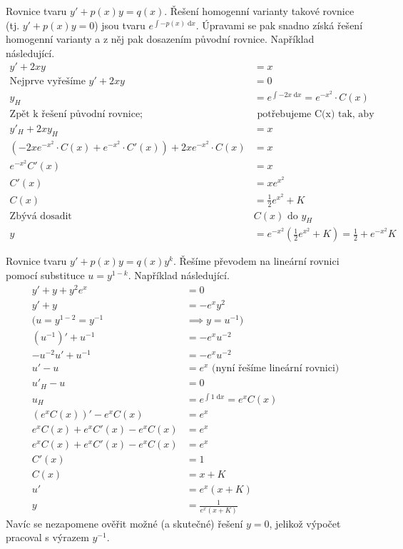 \begin{example}[Lineární rovnice]
    Rovnice tvaru $y' + p(x)y = q(x)$.
    Řešení homogenní varianty takové rovnice (tj. $y' + p(x)y = 0$)
    jsou tvaru $e^{\int -p(x) \; \text{d}x}$.
    Úpravami se pak snadno získá řešení homogenní varianty a z něj pak
    dosazením původní rovnice.
    Například následující.
\begin{align*}
    y' + 2xy        &= x \\
    \text{Nejprve vyřešíme } y' + 2xy &= 0 &\\
    y_H &= e^{\int -2x \; \text{d}x} = e^{-x^2} \cdot C(x) \\
    \text{Zpět k řešení původní rovnice;}&\text{ potřebujeme C(x) tak, aby} \\
    y'_H + 2xy_H   &= x \\
    (-2x e^{-x^2} \cdot C(x) + e^{-x^2} \cdot C'(x)) + 2x e^{-x^2}\cdot C(x) &= x \\
    e^{-x^2} C'(x) &= x \\
    C'(x) &= x e^{x^2} \\
    C(x)  &= \frac{1}{2} e^{x^2} + K \\
    \text{Zbývá dosadit }& C(x) \text{ do } y_H \\
    y &= e^{-x^2} (\frac{1}{2} e^{x^2} + K) = \frac{1}{2} + e^{-x^2} K
\end{align*}
\end{example}

\begin{example}
    Rovnice tvaru $y' + p(x)y = q(x)y^k$. Řešíme převodem na lineární
    rovnici pomocí substituce $u = y^{1-k}$. Například následující.
\begin{align*}
    y' + y + y^2 e^x  &= 0 \\
    y' + y          &= - e^x y^2 \\
    (u = y^{1-2} = y^{-1} &\implies y = u^{-1}) \\
    (u^{-1})' + u^{-1}    &= - e^x u^{-2} \\
    -u^{-2} u' + u^{-1}   &= - e^x u^{-2} \\
    u' - u          &= e^x  \text{ (nyní řešíme lineární rovnici)}  \\
    u'_H - u        &= 0 \\
    u_H             &= e^{\int 1 \; \text{d}x} = e^x C(x) \\
    (e^{x} C(x))' - e^{x} C(x) &= e^x \\
    e^x C(x) + e^x C'(x) - e^{x} C(x) &= e^x \\
    e^x C(x) + e^x C'(x) - e^{x} C(x) &= e^x \\
    C'(x) &= 1 \\
    C(x)  &= x + K \\
    u'    &= e^x (x + K) \\
    y     &= \frac{1}{e^x (x + K)}
\end{align*}
Navíc se nezapomene ověřit možné (a skutečné) řešení $y = 0$, jelikož
výpočet pracoval s výrazem $y^{-1}$.
\end{example}

